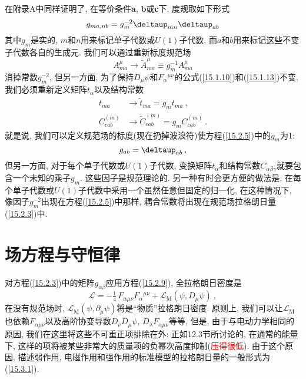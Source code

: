 在附录A中同样证明了, 在等价条件{\bf{a}}, {\bf{b}}或{\bf{c}}下, 度规取如下形式\begin{equation}
g_{ma,nb}=g_{m}^{-2}\deltaup_{mn}\deltaup_{ab}  \label{15.2.5}
\end{equation}%
其中$g_{m}$是实的, $m$和$n$用来标记单子代数或$U(1)$子代数, 而$a$和$b$用来标记这些不变子代数各自的生成元. 
我们可以通过重新标度规范场
\begin{equation}
A_{ma}^{\mu }\rightarrow \tilde{A}_{ma}^{\mu }\equiv g_{m}^{-1}A_{ma}^{\mu }  \label{15.2.6}
\end{equation}%
消掉常数$g_{m}^{-2}$, 但另一方面, 为了保持$D_{\mu }\psi $和$F_{\alpha}{}^{\mu\nu}$的公式(\ref{15.1.10})和(\ref{15.1.13})不变, 
我们必须重新定义矩阵$t_{\alpha }$以及结构常数
\begin{align}
t_{ma} &\rightarrow \tilde{t}_{ma}=g_{m}t_{ma}\:,   \label{15.2.7} \\
C_{cab}^{(m)}& \rightarrow \tilde{C}_{cab}^{(m)}=g_{m}C_{cab}^{(m)}\:. \label{15.2.8}
\end{align}%
就是说, 我们{}可以定义规范场的标度(现在扔掉波浪符)使方程(\ref{15.2.5})中的$g_{m}$为1:%
\begin{equation}
g_{ab}=\deltaup_{ab}\:,   \label{15.2.9}
\end{equation}%
但另一方面, 对于每个单子代数或$U(1)$子代数, 变换矩阵$t_{\alpha }$和结构常数$C_{\alpha \beta \gamma }$就要包%
含一个未知的乘子$g_{m}$. 这些因子是规范理论的{}. 另一种有时会更方便的做法是, %
在每个单子代数或$U(1)$子代数中采用一个虽然任意但固定的归一化, 在这种情况下, 像因子$g_{m}^{-2}$出现在方程(\ref{15.2.5})中那样,
耦合常数将出现在规范场拉格朗日量(\ref{15.2.3})中.


\section{场方程与守恒律}

对方程(\ref{15.2.3})中的矩阵$g_{\alpha \beta }$应用方程(\ref{15.2.9}), 全拉格朗日密度是
\begin{equation}
\mathscr{L}=-\tfrac{1}{4}\,F_{\alpha \mu \nu }F_{\alpha }{}^{\mu\nu}+\mathscr{L}_{\mathrm{M}}(\psi ,D_{\mu }\psi )\:,   \label{15.3.1}
\end{equation}%
在没有规范场时, $\mathscr{L}_{\mathrm{M}}(\psi ,\partial _{\mu }\psi )$将是“物质”拉格朗日密度.
原则上, 我们可以让$\mathscr{L}_{\mathrm{M}}$也依赖$F_{\alpha \mu \nu }$以及高阶协变导数$D_{\nu }D_{\mu }\psi $, $D_{\lambda
}F_{\alpha \mu \nu }$等等, 但是, 由于与电动力学相同的原因, 我们在这里将这些不可重正项排除在外: 正如12.3节所讨论的, 在通常的能量下,
这样的项将被某些非常大的质量项的负幂次高度抑制(\textcolor{red}{压得很低}). 由于这个原因, 描述弱作用, 电磁作用和强作用的标准模型的拉格朗日量的一般形式为(\ref{15.3.1}).

